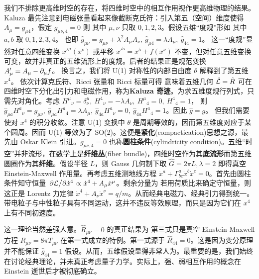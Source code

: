 我们不排除更高维时空的存在，将四维时空中的相互作用视作更高维物理的结果。
Kaluza 最先注意到电磁张量看起来像截断克氏符：引入第五（空间）维度使得 $A_{\mu}=g_{\mu 4}$，假定 $g_{\mu\nu,4}=0$ 则
其中 $\mu,\nu$ 只取 $0,1,2,3$。假设五维“度规”形如
其中 $a,b$ 取 $0,1,2,3,4$。
也即
$\hat g_{\mu\nu}=g_{\mu\nu}+\lambda^2 A_{\mu}A_{\nu},\ \hat g_{\mu 4}=\lambda A_\mu,\ \hat g_{44}=1$。
这一“度规”显然对任意四维变换 $x'^\mu(x^\nu)$ 或平移 $x'^5=x^5+f(x^\nu)$ 不变，但对任意五维变换可变，故并非真正的五维流形上的度规。后者的结果正是规范变换 $A'_\mu=A_\mu-\partial_\mu f$。
换言之，我们将 U(1) 对称性的内部自由度 $\theta$ 解释到了第五维 $x^4$。
依次计算克氏符、Ricci 张量和 Ricci 标量可得
意味着五维几何 $\hat{\mathcal{L}}=\hat R$ 可在四维时空下分化出引力和电磁作用，称为\textbf{Kaluza 奇迹}。为求五维度规行列式，只需先对角化。考虑
$H^\mu{}_{\nu}=\delta^\mu_\nu,\ H^4{}_{\nu}=-\lambda A_\nu,\ H^\mu{}_{4}=0,\ H^4{}_{4}=1$，
则 $\hat g_{\mu a} H^a{}_{\nu}=g_{\mu\nu},\ \hat g_{\mu a} H^a{}_{4}=\lambda A_\mu,\ \hat g_{4 a} H^a{}_{\nu}=0,\ \hat g_{4 a} H^a{}_{4}=1$。因此 $\hat g=g$。
但我们需要使对 $x^4$ 的积分收敛。注意 U(1) 变换中 $\theta$ 是周期等效的，因而第五维度对应于某个圆周。因而 U(1) 等效为了 SO(2)。这便是\textbf{紧化}(compactication)思想之源，最先由 Oskar Klein 引进。$g_{\mu\nu,4}=0$ 也称\textbf{圆柱条件}(cylindricity condition)。五维“时空”并非流形，在数学上是\textbf{纤维丛}(fiber bundle)，四维时空作为其\textbf{底流形}而第五维圆圈作为其\textbf{纤维}。假设半径 $L$，则
Gauss 几何制下取 $\hat G=2\pi L,\lambda=2$ 即得真空 Einstein-Maxwell 作用量。再考虑五维测地线方程 $\ddot x^a+\Gamma^a_{bc}\dot x^b \dot x^c=0$。首先由圆柱条件知守恒量 $\pdv*{\mathcal{L}}{\dot x^4}\propto\dot x^4+A_\mu\dot x^\mu$。剩余分量为
若用荷质比来确定守恒量，则这正是 Lorentz 力定律 $\dot x^4+A_\nu\dot x^\nu=q/m$。从而经典电磁力、经典引力得到统一。
带电粒子与中性粒子具有不同运动，这并不违反等效原理，而只是因为它们在 $x^4$ 上有不同初速度。

这一理论当然差强人意。$\hat R_{\mu\nu}=0$ 的真正结果为
第三式只是真空 Einstein-Maxwell 方程 $R_{\mu\nu}=8\pi T_{\mu\nu}$ 在第一式成立的特例。第一式源于 $\hat R_{44}=0$。这是因为变分原理并不能保证 $\hat g_{44}=1$ 假设。从而，五维假设显得非常人为。最重要的是，我们始终在讨论经典理论，并未真正考虑量子力学。实际上，强、弱相互作用的概念在 Einstein 逝世后才被彻底确立。

